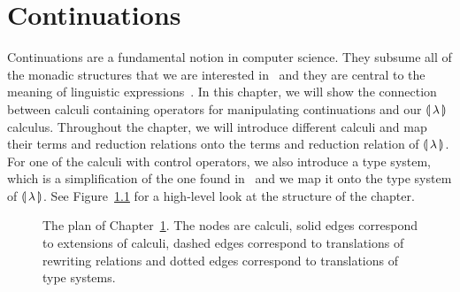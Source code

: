 \chapter{Continuations}
\label{chap:continuations}

Continuations are a fundamental notion in computer science. They subsume
all of the monadic structures that we are interested
in~\cite{filinski1994representing} and they are central to the meaning of
linguistic expressions~\cite{barker2014continuations}. In this chapter, we
will show the connection between calculi containing operators for
manipulating continuations and our $\llparenthesis \, \lambda \, \rrparenthesis$ calculus. Throughout
the chapter, we will introduce different calculi and map their terms and
reduction relations onto the terms and reduction relation of
$\llparenthesis \, \lambda \, \rrparenthesis$. For one of the calculi with control operators, we also
introduce a type system, which is a simplification of the one found
in~\cite{danvy1989functional} and we map it onto the type system of
$\llparenthesis \, \lambda \, \rrparenthesis$. See Figure~\ref{fig:continuation-plan} for a high-level
look at the structure of the chapter.

\begin{figure}[h]
  \begin{center}
  \end{center}
  \caption[The plan of
  Chapter~\ref{chap:continuations}.]{\label{fig:continuation-plan} The plan
    of Chapter~\ref{chap:continuations}. The nodes are calculi, solid edges
    correspond to extensions of calculi, dashed edges correspond to
    translations of rewriting relations and dotted edges correspond to
    translations of type systems.}
\end{figure}


